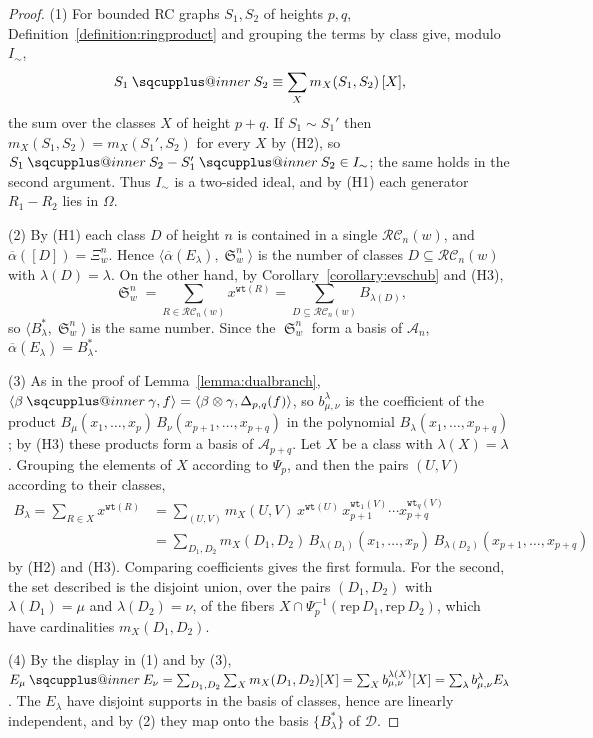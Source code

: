 \documentclass{amsart}
\makeatletter
\newcommand{\sqcupplus@inner}[2]{%
  \vcenter{\hbox{\ooalign{%
    \hfil$\m@th#1\sqcup$\hfil\cr
    \hfil\raisebox{0.15ex}{$\m@th#1\scriptscriptstyle+$}\hfil\cr
  }}}%
}
\newcommand{\sqcupplus}{\mathbin{\mathpalette\sqcupplus@inner\relax}}
\theoremstyle{definition}
\theoremstyle{remark}
\numberwithin{equation}{subsection}
\DeclareMathOperator{\sch}{\mathfrak{S}}
\newcommand{\wtt}{\mathtt{wt}}
\newcommand{\RC}{\mathcal{RC}}
\newcommand{\dsch}{\ensuremath{\Xi}}
\newcommand{\coma}{\mathcal{A}}
\newcommand{\dcoma}{\mathcal{D}}
\makeatother
\begin{document}
\begin{proof}
(1) For bounded RC graphs $S_1,S_2$ of heights $p,q$, Definition~\ref{definition:ringproduct} and grouping the terms by class give, modulo $I_\sim$,
$$S_1\sqcupplus S_2\equiv\sum_{X}m_X(S_1,S_2)\,[X]\text{,}$$
the sum over the classes $X$ of height $p+q$. If $S_1\sim S_1'$ then $m_X(S_1,S_2)=m_X(S_1',S_2)$ for every $X$ by (H2), so $S_1\sqcupplus S_2-S_1'\sqcupplus S_2\in I_\sim$; the same holds in the second argument. Thus $I_\sim$ is a two-sided ideal, and by (H1) each generator $R_1-R_2$ lies in $\Omega$.

(2) By (H1) each class $D$ of height $n$ is contained in a single $\RC_n(w)$, and $\overline\alpha([D])=\dsch_w^n$. Hence $\langle\overline\alpha(E_\lambda),\sch_w^n\rangle$ is the number of classes $D\subseteq\RC_n(w)$ with $\lambda(D)=\lambda$. On the other hand, by Corollary~\ref{corollary:evschub} and (H3),
$$\sch_w^n=\sum_{R\in\RC_n(w)}x^{\wtt(R)}=\sum_{D\subseteq\RC_n(w)}B_{\lambda(D)}\text{,}$$
so $\langle B_\lambda^*,\sch_w^n\rangle$ is the same number. Since the $\sch_w^n$ form a basis of $\coma_n$, $\overline\alpha(E_\lambda)=B_\lambda^*$.

(3) As in the proof of Lemma~\ref{lemma:dualbranch}, $\langle\beta\sqcupplus\gamma,f\rangle=\langle\beta\otimes\gamma,\Delta_{p,q}(f)\rangle$, so $b_{\mu,\nu}^\lambda$ is the coefficient of the product $B_\mu(x_1,\ldots,x_p)\,B_\nu(x_{p+1},\ldots,x_{p+q})$ in the polynomial $B_\lambda(x_1,\ldots,x_{p+q})$; by (H3) these products form a basis of $\coma_{p+q}$. Let $X$ be a class with $\lambda(X)=\lambda$. Grouping the elements of $X$ according to $\Psi_p$, and then the pairs $(U,V)$ according to their classes,
\begin{align*}
B_\lambda=\sum_{R\in X}x^{\wtt(R)}&=\sum_{(U,V)}m_X(U,V)\,x^{\wtt(U)}\,x_{p+1}^{\wtt_1(V)}\cdots x_{p+q}^{\wtt_q(V)}\\
&=\sum_{D_1,D_2}m_X(D_1,D_2)\,B_{\lambda(D_1)}(x_1,\ldots,x_p)\,B_{\lambda(D_2)}(x_{p+1},\ldots,x_{p+q})
\end{align*}
by (H2) and (H3). Comparing coefficients gives the first formula. For the second, the set described is the disjoint union, over the pairs $(D_1,D_2)$ with $\lambda(D_1)=\mu$ and $\lambda(D_2)=\nu$, of the fibers $X\cap\Psi_p^{-1}(\mathrm{rep}\,D_1,\mathrm{rep}\,D_2)$, which have cardinalities $m_X(D_1,D_2)$.

(4) By the display in (1) and by (3), $E_\mu\sqcupplus E_\nu=\sum_{D_1,D_2}\sum_Xm_X(D_1,D_2)[X]=\sum_Xb_{\mu,\nu}^{\lambda(X)}[X]=\sum_\lambda b_{\mu,\nu}^\lambda E_\lambda$. The $E_\lambda$ have disjoint supports in the basis of classes, hence are linearly independent, and by (2) they map onto the basis $\{B_\lambda^*\}$ of $\dcoma$.
\end{proof}
\end{document}

